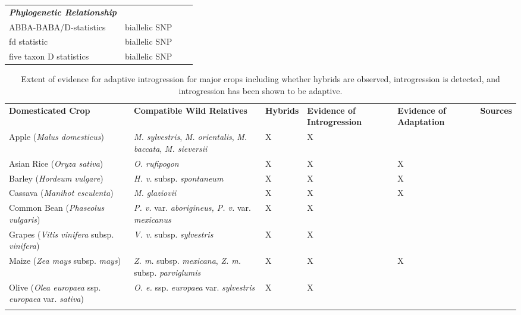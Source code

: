 \documentclass[11pt]{article}
\begin{document}
\begin{table}[h]
\begin{center}
\begin{tabular}{G{2.8cm}G{3.5cm}G{4cm}G{4cm}}
{\emph{\bf Phylogenetic Relationship}} &   &   &   \\
ABBA-BABA/D-statistics	 & biallelic SNP  &	\cite{durand2011}	 &  \cite{heliconius2012} \\
fd statistic &	biallelic SNP &	\cite{martin2015}  &	\cite{zhang2016genome} \\ 
five taxon D statistics	& biallelic SNP	&  \cite{pease2015}	& \cite{fontaine2015} \\

\end{tabular}
\end{center}
\end{table} 

\hspace*{-1.5cm}
\begin{table}
\caption{\small Extent of evidence for adaptive introgression for major crops including whether hybrids are observed, introgression is detected, and introgression has been shown to be adaptive.} \label{tab:intro}
        \small
    \begin{tabular}{G{4.5cm}G{5.5cm}C{1.75cm}C{2.5cm}C{2.25cm}G{3.5cm}}
    \\\toprule  
    {\bf Domesticated Crop}	& {\bf Compatible Wild Relatives} &	{\bf Hybrids} &  {\bf Evidence of Introgression } &	{\bf Evidence of Adaptation} & {\bf Sources}\\ \midrule
Apple (\emph{Malus domesticus}) & \emph{M. sylvestris}, \emph{M. orientalis}, \emph{M. baccata}, \emph{M. sieversii}  & X & X & & \cite{ma2017reduced} \\
Asian Rice (\emph{Oryza sativa}) & \emph{O. rufipogon} & X & X & X & \cite{Huang2012} \\ 
Barley (\emph{Hordeum vulgare}) & \emph{H. v.} subsp. \emph{spontaneum} & X & X & X & \cite{Poets2015} \\
Cassava (\emph{Manihot esculenta}) & \emph{M. glaziovii} & X & X & X & \cite{bredeson2016sequencing} \\
Common Bean (\emph{Phaseolus vulgaris}) & \emph{P. v.} var. \emph{aborigineus, P. v.} var. \emph{mexicanus} & X & X &  & \cite{rendon2017genomic} \\
Grapes (\emph{Vitis vinifera} subsp. \emph{vinifera}) & \emph{V. v.} subsp. \emph{sylvestris} & X & X &  &  \cite{myles2011genetic} \\
Maize (\emph{Zea mays} subsp. \emph{mays}) & \emph{Z. m.} subsp. \emph{mexicana}, \emph{Z. m. } subsp. \emph{parviglumis} & X & X & X & \cite{Hufford2013} \\
Olive (\emph{Olea europaea} ssp. \emph{europaea} var. \emph{sativa}) & \emph{O. e.} ssp. \emph{europaea} var. \emph{sylvestris} & X & X & & \cite{diez2015olive} \\ 


\end{tabular}
\end{table}
\end{document}
